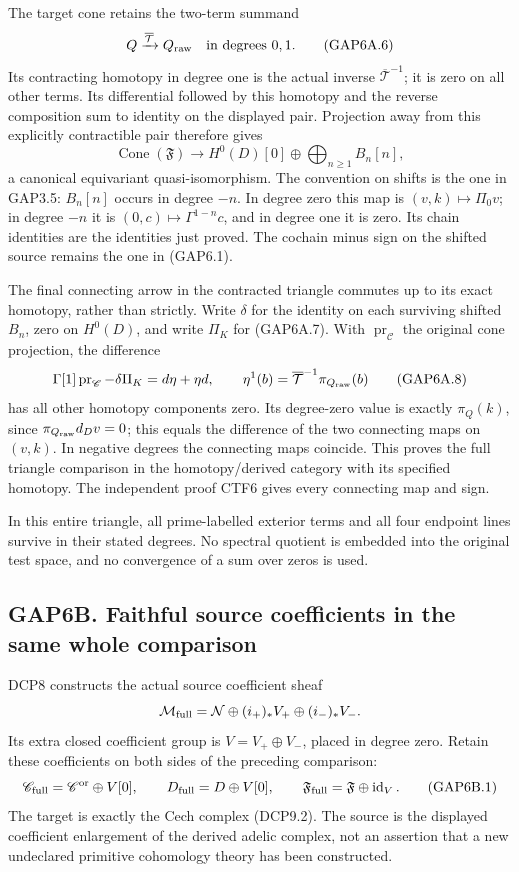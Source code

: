 The target cone retains the two-term summand \[
Q\xrightarrow{\overline{\mathcal T}}Q_{\rm raw}
\quad\text{in degrees }0,1.
\tag{GAP6A.6}
\] Its contracting homotopy in degree one is the actual inverse
\(\overline{\mathcal T}^{-1}\); it is zero on all other terms. Its
differential followed by this homotopy and the reverse composition sum
to identity on the displayed pair. Projection away from this explicitly
contractible pair therefore gives \[
\operatorname{Cone}(\mathfrak F)\longrightarrow
H^0(D)[0]\oplus\bigoplus_{n\ge1}B_n[n],
\tag{GAP6A.7}
\] a canonical equivariant quasi-isomorphism. The convention on shifts
is the one in GAP3.5: \(B_n[n]\) occurs in degree \(-n\). In degree zero
this map is \((v,k)\mapsto\Pi_0v\); in degree \(-n\) it is
\((0,c)\mapsto\Gamma^{1-n}c\), and in degree one it is zero. Its chain
identities are the identities just proved. The cochain minus sign on the
shifted source remains the one in (GAP6.1).

The final connecting arrow in the contracted triangle commutes up to its
exact homotopy, rather than strictly. Write \(\delta\) for the identity
on each surviving shifted \(B_n\), zero on \(H^0(D)\), and write
\(\Pi_K\) for (GAP6A.7). With \(\operatorname{pr}_{\mathscr C}\) the
original cone projection, the difference \[
\Gamma[1]\operatorname{pr}_{\mathscr C}-\delta\Pi_K
=d\eta+\eta d,\qquad
\eta^1(b)=\overline{\mathcal T}^{-1}\pi_{Q_{\rm raw}}(b)
\tag{GAP6A.8}
\] has all other homotopy components zero. Its degree-zero value is
exactly \(\pi_Q(k)\), since \(\pi_{Q_{\rm raw}}d_Dv=0\); this equals the
difference of the two connecting maps on \((v,k)\). In negative degrees
the connecting maps coincide. This proves the full triangle comparison
in the homotopy/derived category with its specified homotopy. The
independent proof CTF6 gives every connecting map and sign.

In this entire triangle, all prime-labelled exterior terms and all four
endpoint lines survive in their stated degrees. No spectral quotient is
embedded into the original test space, and no convergence of a sum over
zeros is used.

\subsection{GAP6B. Faithful source coefficients in the same whole
comparison}\label{gap6b.-faithful-source-coefficients-in-the-same-whole-comparison}

DCP8 constructs the actual source coefficient sheaf \[
\mathcal M_{\rm full}=\mathcal N\oplus(i_+)_*V_+\oplus(i_-)_*V_-.
\] Its extra closed coefficient group is \(V=V_+\oplus V_-\), placed in
degree zero. Retain these coefficients on both sides of the preceding
comparison: \[
\mathscr C_{\rm full}=\mathscr C^{\rm or}\oplus V[0],\qquad
D_{\rm full}=D\oplus V[0],\qquad
\mathfrak F_{\rm full}=\mathfrak F\oplus\operatorname{id}_V.
\tag{GAP6B.1}
\] The target is exactly the Cech complex (DCP9.2). The source is the
displayed coefficient enlargement of the derived adelic complex, not an
assertion that a new undeclared primitive cohomology theory has been
constructed.

